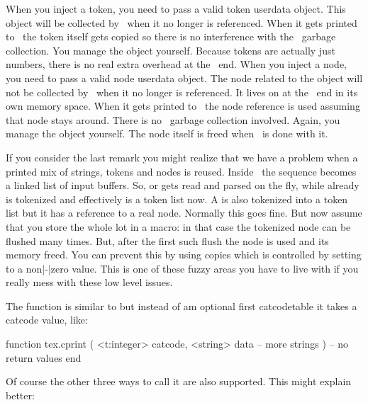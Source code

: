 \startitemize
\startitem
    When you inject a token, you need to pass a valid token userdata object. This
    object will be collected by \LUA\ when it no longer is referenced. When it gets
    printed to \TEX\ the token itself gets copied so there is no interference with the
    \LUA\ garbage collection. You manage the object yourself. Because tokens are
    actually just numbers, there is no real extra overhead at the \TEX\ end.
\stopitem
\startitem
    When you inject a node, you need to pass a valid node userdata object. The
    node related to the object will not be collected by \LUA\ when it no longer
    is referenced. It lives on at the \TEX\ end in its own memory space. When it
    gets printed to \TEX\ the node reference is used assuming that node stays
    around. There is no \LUA\ garbage collection involved. Again, you manage the
    object yourself. The node itself is freed when \TEX\ is done with it.
\stopitem
\stopitemize

If you consider the last remark you might realize that we have a problem when a
printed mix of strings, tokens and nodes is reused. Inside \TEX\ the sequence
becomes a linked list of input buffers. So,  or 
gets read and parsed on the fly, while  already is
tokenized and effectively is a token list now. A  is also
tokenized into a token list but it has a reference to a real node. Normally this
goes fine. But now assume that you store the whole lot in a macro: in that case
the tokenized node can be flushed many times. But, after the first such flush the
node is used and its memory freed. You can prevent this by using copies which is
controlled by setting \type {\luacopyinputnodes} to a non|-|zero value. This is one
of these fuzzy areas you have to live with if you really mess with these low
level issues.

The  function is similar to  but instead of
am optional first catcodetable it takes a catcode value, like:

\starttyping[option=LUA]
function tex.cprint (
     <t:integer> catcode,
     <string>    data
    -- more strings
)
    -- no return values
end
\stoptyping

Of course the other three ways to call it are also supported. This might explain
better:

